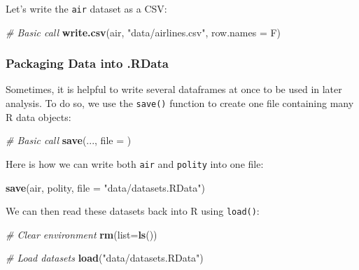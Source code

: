 \documentclass[
]{book}
\newenvironment{Shaded}{\begin{snugshade}}{\end{snugshade}}
\newcommand{\CommentTok}[1]{\textcolor[rgb]{0.56,0.35,0.01}{\textit{#1}}}
\newcommand{\DataTypeTok}[1]{\textcolor[rgb]{0.13,0.29,0.53}{#1}}
\newcommand{\KeywordTok}[1]{\textcolor[rgb]{0.13,0.29,0.53}{\textbf{#1}}}
\newcommand{\NormalTok}[1]{#1}
\newcommand{\StringTok}[1]{\textcolor[rgb]{0.31,0.60,0.02}{#1}}
\begin{document}
Let's write the \texttt{air} dataset as a CSV:

\begin{Shaded}
\begin{Highlighting}[]
\CommentTok{# Basic call}
\KeywordTok{write.csv}\NormalTok{(air, }\StringTok{"data/airlines.csv"}\NormalTok{, }\DataTypeTok{row.names =}\NormalTok{ F)}
\end{Highlighting}
\end{Shaded}

\hypertarget{packaging-data-into-.rdata}{%
\subsubsection*{Packaging Data into .RData}\label{packaging-data-into-.rdata}}

Sometimes, it is helpful to write several dataframes at once to be used in later analysis. To do so, we use the \texttt{save()} function to create one file containing many R data objects:

\begin{Shaded}
\begin{Highlighting}[]
\CommentTok{# Basic call}
\KeywordTok{save}\NormalTok{(..., }\DataTypeTok{file =}\NormalTok{ )}
\end{Highlighting}
\end{Shaded}

Here is how we can write both \texttt{air} and \texttt{polity} into one file:

\begin{Shaded}
\begin{Highlighting}[]
\KeywordTok{save}\NormalTok{(air, polity, }\DataTypeTok{file =} \StringTok{"data/datasets.RData"}\NormalTok{)}
\end{Highlighting}
\end{Shaded}

We can then read these datasets back into R using \texttt{load()}:

\begin{Shaded}
\begin{Highlighting}[]
\CommentTok{# Clear environment}
\KeywordTok{rm}\NormalTok{(}\DataTypeTok{list=}\KeywordTok{ls}\NormalTok{())}

\CommentTok{# Load datasets}
\KeywordTok{load}\NormalTok{(}\StringTok{"data/datasets.RData"}\NormalTok{)}
\end{Highlighting}
\end{Shaded}
\end{document}
